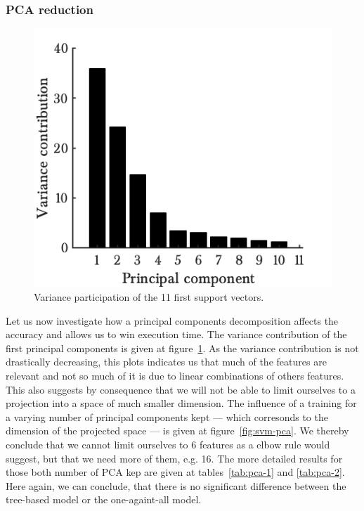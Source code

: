 \FloatBarrier
\subsubsection{PCA reduction}

\begin{figure}
\begin{center}
    \includegraphics[width=.45\textwidth]{parts/chap-4/img-svm/pca-var.png}
    \caption{Variance participation of the 11 first support vectors.}
    \label{fig:pca-var}
\end{center}
\end{figure}
Let us now investigate how a principal components decomposition affects the accuracy and allows us to win execution time. The variance contribution of the first principal components is given at figure~\ref{fig:pca-var}. As the variance contribution is not drastically decreasing, this plots indicates us that much of the features are relevant and not so much of it is due to linear combinations of others features. This also suggests by consequence that we will not be able to limit ourselves to a projection into a space of much smaller dimension. The influence of a training for a varying number of principal components kept --- which corresonds to the dimension of the projected space --- is given at figure~\ref{fig:svm-pca}. We thereby conclude that we cannot limit ourselves to 6 features as a elbow rule would suggest, but that we need more of them, e.g. 16. The more detailed results for those both number of PCA kep are given at tables~\ref{tab:pca-1} and \ref{tab:pca-2}. Here again, we can conclude, that there is no significant difference between the tree-based model or the one-againt-all model. 

